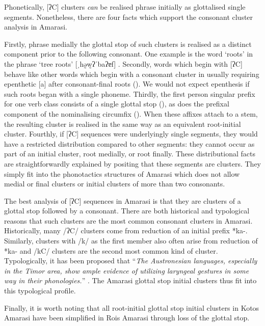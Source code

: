Phonetically, [ʔC] clusters \emph{can} be realised
phrase initially as glottalised single segments.
Nonetheless, there are four facts which
support the consonant cluster analysis in Amarasi.

Firstly, phrase medially the glottal stop of such clusters
is realised as a distinct component prior to the following consonant.
One example is the word  `roots' in the phrase
 `tree roots' {\ra} [ˌhə̰w̰ʔˈbaʔɐf] {}.
Secondly, words which begin with [ʔC] behave like other words which begin with a consonant cluster
in usually requiring epenthetic [a] after consonant-final roots ().
We would not expect epenthesis if such roots began with a single phoneme.
Thirdly, the first person singular prefix for one verb class
consists of a single glottal stop  (), as does the prefixal
component of the nominalising circumfix  ().
When these affixes attach to a stem, the resulting cluster
is realised in the same way as an equivalent root-initial cluster.
Fourthly, if [ʔC] sequences were underlyingly single segments,
they would have a restricted distribution compared to other segments:
they cannot occur as part of an initial cluster, root medially, or root finally.
These distributional facts are straightforwardly explained by
positing that these segments are clusters.
They simply fit into the phonotactics structures of Amarasi
which does not allow medial or final clusters or initial
clusters of more than two consonants.

The best analysis of [ʔC] sequences in Amarasi
is that they are clusters of a glottal stop followed by a consonant.
There are both historical and typological reasons that such
clusters are the most common consonant clusters in Amarasi.
Historically, many /ʔC/ clusters come from reduction of an initial prefix *ka-.
Similarly, clusters with /k/ as the first member also
often arise from reduction of *ka- \citep[387f]{ed18b}
and /kC/ clusters are the second most common kind of cluster.
Typologically, it has been proposed that ``\emph{The Austronesian languages,
especially in the Timor area, show ample evidence of
utilizing laryngeal gestures in some way in their phonologies.}'' \citep[216]{do03}.
The Amarasi glottal stop initial clusters thus fit into this typological profile.

Finally, it is worth noting that all root-initial glottal
stop initial clusters in Kotos Amarasi have
been simplified in Ro{\Q}is Amarasi through loss
of the glottal stop.
